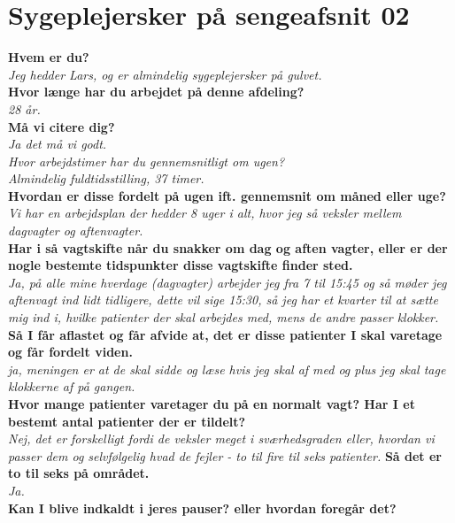 \section{Sygeplejersker på sengeafsnit 02} \label{bilagO2}
\textbf{Hvem er du?}\\
\noindent
\textit{Jeg hedder Lars, og er almindelig sygeplejersker på gulvet.}\\
\noindent
\textbf{Hvor længe har du arbejdet på denne afdeling?} \\
\noindent
\textit{28 år.}\\
\noindent
\textbf{Må vi citere dig?}\\
\noindent
\textit{Ja det må vi godt.}\\
\noindent
\textit{Hvor arbejdstimer har du gennemsnitligt om ugen?}\\
\noindent
\textit{ Almindelig fuldtidsstilling, 37 timer.}\\
\noindent
\textbf{Hvordan er disse fordelt på ugen ift. gennemsnit om måned eller uge?}\\
\noindent
\textit{Vi har en arbejdsplan der hedder 8 uger i alt, hvor jeg så veksler mellem dagvagter og aftenvagter.}\\
\noindent
\textbf{Har i så vagtskifte når du snakker om dag og aften vagter, eller er der nogle bestemte tidspunkter disse vagtskifte finder sted.}\\
\noindent
\textit{Ja, på alle mine hverdage (dagvagter) arbejder jeg fra 7 til 15:45 og så møder jeg aftenvagt ind lidt tidligere, dette vil sige 15:30, så jeg har et kvarter til at sætte mig ind i, hvilke patienter der skal arbejdes med, mens de andre passer klokker.}\\
\noindent
\textbf{Så I får aflastet og får afvide at, det er disse patienter I skal varetage og får fordelt viden.}\\
\noindent
\textit{ja, meningen er at de skal sidde og læse hvis jeg skal af med og plus jeg skal tage klokkerne af på gangen.}\\
\noindent
\textbf{Hvor mange patienter varetager du på en normalt vagt? Har I et bestemt antal patienter der er tildelt?}\\
\noindent
\textit{ Nej, det er forskelligt fordi de veksler meget i sværhedsgraden eller, hvordan vi passer dem og selvfølgelig hvad de fejler - to til fire til seks patienter.}
\textbf{ Så det er to til seks på området.}\\
\noindent
\textit{Ja.}\\
\noindent
\textbf{Kan I blive indkaldt i jeres pauser? eller hvordan foregår det?}\\
